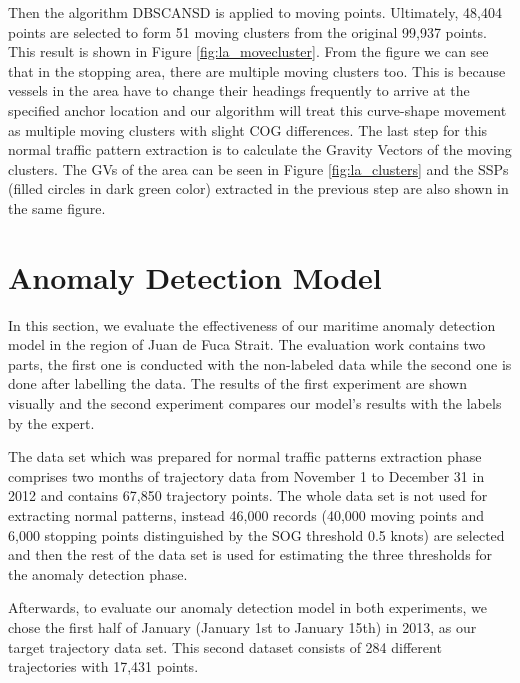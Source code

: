 \documentclass[12pt,glossary]{dalcsthesis}
\begin{document}
Then the algorithm DBSCANSD is applied to moving points. Ultimately, 48,404 points are selected to form 51 moving clusters from the original 99,937 points. This result is shown in Figure \ref{fig:la_movecluster}. From the figure we can see that in the stopping area, there are multiple moving clusters too. This is because vessels in the area have to change their headings frequently to arrive at the specified anchor location and our algorithm will treat this curve-shape movement as multiple moving clusters with slight COG differences. The last step for this normal traffic pattern extraction is to calculate the Gravity Vectors of the moving clusters. The GVs of the area can be seen in Figure \ref{fig:la_clusters} and the SSPs (filled circles in dark green color) extracted in the previous step are also shown in the same figure.


\section{Anomaly Detection Model}
\label{sec:exp_2}
In this section, we evaluate the effectiveness of our maritime anomaly detection model in the region of Juan de Fuca Strait. %
The evaluation work contains two parts, the first one is conducted with the non-labeled data while the second one is done after labelling the data. The results of the first experiment are shown visually and the second experiment compares our model's results with the labels by the expert.


The data set which was prepared for normal traffic patterns extraction phase comprises two months of trajectory data from November 1 to December 31 in 2012 and contains 67,850 trajectory points. The whole data set is not used for extracting normal patterns, instead 46,000 records (40,000 moving points and 6,000 stopping points distinguished by the SOG threshold 0.5 knots) are selected and then the rest of the data set is used for estimating the three thresholds for the anomaly detection phase. 

Afterwards, to evaluate our anomaly detection model in  both experiments, we chose the first half of January (January 1st to January 15th) in 2013, as our target trajectory data set. This second dataset consists of 284 different trajectories with 17,431 points. 
\end{document}
